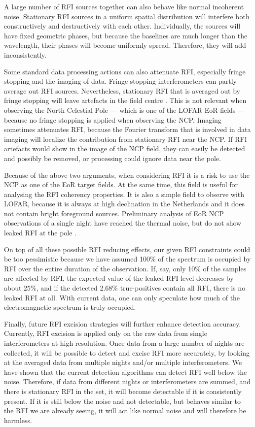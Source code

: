 \documentclass[useAMS,usenatbib]{mn2e}
\newcommand{\editmark}[1]{{\color{red}{\textbf{#1}}}}
\begin{document}
A large number of RFI sources together can also behave like normal incoherent noise. Stationary RFI sources in a uniform spatial distribution will interfere both constructively and destructively with each other. Individually, the sources will have fixed geometric phases, but because the baselines are much longer than the wavelength, their phases will become uniformly spread. Therefore, they will add inconsistently.

Some standard data processing actions can also attenuate RFI, especially fringe stopping and the imaging of data. Fringe stopping interferometers can partly average out RFI sources. Nevertheless, stationary RFI that is averaged out by fringe stopping will leave artefacts in the field centre \citep{post-correlation-filtering}. This is not relevant when observing the North Celestial Pole --- which is one of the LOFAR EoR fields --- because no fringe stopping is applied when observing the NCP. Imaging sometimes attenuates RFI, because the Fourier transform that is involved in data imaging will localize the contribution from stationary RFI near the NCP. If RFI artefacts would show in the image of the NCP field, they can easily be detected and possibly be removed, or processing could ignore data near the pole.

Because of the above two arguments, when considering RFI it is a risk to use the NCP as one of the EoR target fields. At the same time, this field is useful for analysing the RFI coherency properties. It is also a simple field to observe with LOFAR, because it is always at high declination in the Netherlands and it does not contain bright \editmark{celestial} foreground sources. Preliminary analysis of EoR NCP observations of a single night have \editmark{almost} reached the thermal noise, but do not show leaked RFI at the pole \citep[\S4.3]{ncp-eor-yatawatta}.

On top of all these possible RFI reducing effects, our given RFI constraints could be too pessimistic because we have assumed 100\% of the spectrum is occupied by RFI over the entire duration of the observation. If, say, only 10\% of the samples are affected by RFI, the expected value of the leaked RFI level decreases by about $25$\%, and if the detected 2.68\% true-positives contain all RFI, there is no leaked RFI at all. With current data, one can only speculate how much of the electromagnetic spectrum is truly occupied.

Finally, future RFI excision strategies will further enhance detection accuracy. Currently, RFI excision is applied only on the raw data from single interferometers at high resolution. Once data from a large number of nights are collected, it will be possible to detect and excise RFI more accurately, by looking at the averaged data from multiple nights and/or multiple interferometers. We have shown that the current detection algorithms can detect RFI well below the noise. Therefore, if data from different nights or interferometers are summed, and there is stationary RFI in the set, it will become detectable if it is consistently present. If it is still below the noise and not detectable, but behaves similar to the RFI we are already seeing, it will act like normal noise and will therefore be harmless.
\end{document}
